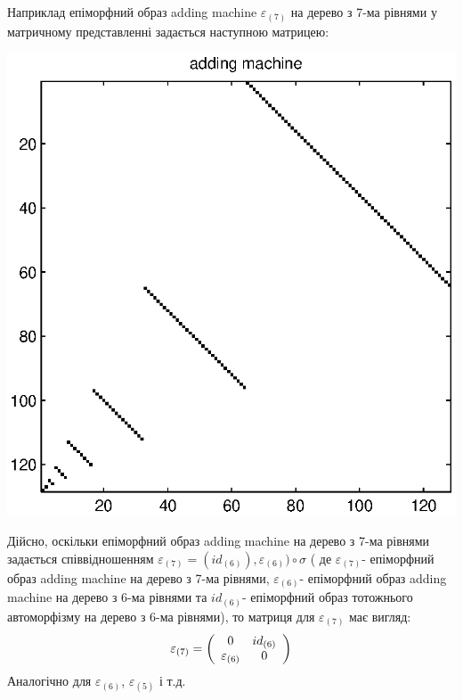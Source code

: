 \documentclass[a4paper,12pt]{article} \usepackage{a4wide}
\numberwithin{equation}{subsection}
\begin{document}
Наприклад епіморфний образ adding machine $\varepsilon_{(7)}$ на дерево з 7-ма рівнями у матричному представленні задається наступною матрицею:
\begin{center}
\includegraphics[scale=0.7]{ammatr.eps}
\end{center}


Дійсно, оскільки епіморфний образ adding machine на дерево з 7-ма рівнями задається співвідношенням $\varepsilon_{(7)}=(id_{(6)}),\varepsilon_{(6)}) \circ \sigma$ ( де $\varepsilon_{(7)}$- епіморфний образ adding machine на дерево з 7-ма рівнями, $\varepsilon_{(6)}$- епіморфний образ adding machine на дерево з 6-ма рівнями та $id_{(6)}$- епіморфний образ тотожнього автоморфізму на дерево з 6-ма рівнями), то матриця  для $\varepsilon_{(7)}$ має вигляд:
\[
\varepsilon_{(7)} = \left( {\begin{array}{*{20}c}
   0 & id_{(6)}  \\
   \varepsilon_{(6)} & 0  \\
\end{array}} \right)
\]
 Аналогічно для $\varepsilon_{(6)}$, $\varepsilon_{(5)}$ і т.д.
\end{document}

